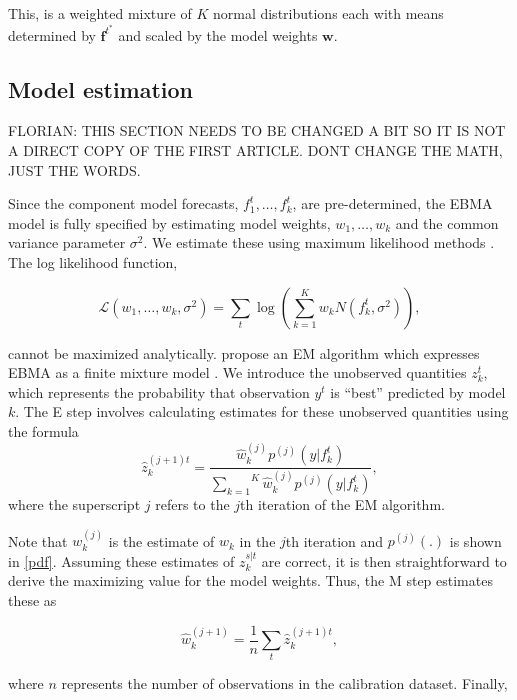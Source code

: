 \documentclass[12pt,fullpage,endnotes]{article}
\begin{document}
\noindent This, is a weighted mixture of $K$ normal distributions each with 
means  determined by $\mathbf{f}^{t^\ast}$ and scaled by the
model weights $\mathbf{w}$.

\subsection{Model estimation}

FLORIAN: THIS SECTION NEEDS TO BE CHANGED A BIT SO IT IS NOT A DIRECT
COPY OF THE FIRST ARTICLE.  DONT CHANGE THE MATH, JUST THE WORDS.


Since the component model forecasts, $f^t_1, \ldots, f^t_k$, are
pre-determined, the EBMA model is fully specified by estimating model
weights, $w_1, \ldots, w_k$ and the common variance parameter
$\sigma^2$.  We estimate these using maximum likelihood methods
\citep{Raftery:2005}.  The log likelihood function,

\begin{equation}
\mathcal{L}(w_1, \ldots, w_k, \sigma^2)=\sum_t\log\left(\sum_{k=1}^Kw_kN(f^t_k, \sigma^2) \right),
\end{equation}


\noindent cannot be maximized analytically.  \citet{Raftery:2005}
propose an EM algorithm which expresses EBMA as a finite mixture model
\citep{mclachlan:peel:2000,imai:tingley:2012}.  We introduce the
unobserved quantities $z_k^t$, which represents the probability that
observation $y^t$ is ``best'' predicted by model $k$.  The E step
involves calculating estimates for these unobserved quantities using
the formula
\begin{equation}
\label{E-step}
\hat{z}^{(j+1)t}_{k} = \frac{\hat{w}^{(j)}_k
p^{(j)}(y|f_{k}^{t})}{\overset{K}{\underset{k=1}{\sum}}\hat{w}^{(j)}_kp^{(j)}(y|f_{k}^{t})},
\end{equation}
\noindent where the superscript $j$ refers to the $j$th iteration of
the EM algorithm.

Note that $w_k^{(j)}$ is the estimate of $w_k$ in the $j$th iteration and
$p^{(j)}(.)$ is shown in \eqref{pdf}.  Assuming these estimates of
$z_{k}^{s|t}$ are correct, it is then straightforward to derive the
maximizing value for the model weights. Thus, the M step estimates
these as 

\begin{equation}
\label{M-step}
\hat{w}^{(j+1)}_k=\frac{1}{n}\underset{t}{\sum}\hat{z}^{(j+1)t}_{k},
\end{equation}

\noindent where $n$ represents the number of observations in the
calibration dataset.  Finally,
\end{document}
